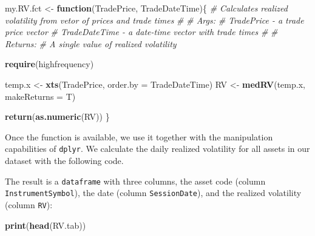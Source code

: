 \documentclass[11pt,]{book}
\newenvironment{Shaded}{\begin{snugshade}}{\end{snugshade}}
\newcommand{\KeywordTok}[1]{\textcolor[rgb]{0.27,0.27,0.27}{\textbf{#1}}}
\newcommand{\DataTypeTok}[1]{\textcolor[rgb]{0.27,0.27,0.27}{#1}}
\newcommand{\StringTok}[1]{\textcolor[rgb]{0.5,0.5,0.5}{#1}}
\newcommand{\CommentTok}[1]{\textcolor[rgb]{0.56,0.35,0.01}{\textit{#1}}}
\newcommand{\ControlFlowTok}[1]{\textcolor[rgb]{0.13,0.29,0.53}{\textbf{#1}}}
\newcommand{\OperatorTok}[1]{\textcolor[rgb]{0.81,0.36,0.00}{\textbf{#1}}}
\newcommand{\NormalTok}[1]{#1}
\begin{document}
\begin{Shaded}
\begin{Highlighting}[]
\NormalTok{my.RV.fct <-}\StringTok{ }\ControlFlowTok{function}\NormalTok{(TradePrice, TradeDateTime)\{}
  \CommentTok{# Calculates realized volatility from vetor of prices and trade times}
  \CommentTok{#}
  \CommentTok{# Args:}
  \CommentTok{#   TradePrice - a trade price vector}
  \CommentTok{#   TradeDateTime - a date-time vector with trade times}
  \CommentTok{#}
  \CommentTok{# Returns:}
  \CommentTok{#   A single value of realized volatility}
  
  \KeywordTok{require}\NormalTok{(highfrequency)}
  
\NormalTok{  temp.x <-}\StringTok{ }\KeywordTok{xts}\NormalTok{(TradePrice, }\DataTypeTok{order.by =}\NormalTok{ TradeDateTime)}
\NormalTok{  RV <-}\StringTok{ }\KeywordTok{medRV}\NormalTok{(temp.x, }\DataTypeTok{makeReturns =}\NormalTok{ T)}
  
  \KeywordTok{return}\NormalTok{(}\KeywordTok{as.numeric}\NormalTok{(RV))}
\NormalTok{\}}
\end{Highlighting}
\end{Shaded}

Once the function is available, we use it together with the manipulation
capabilities of \texttt{dplyr}. We calculate the daily realized
volatility for all assets in our dataset with the following code.

\begin{Shaded}
\end{Shaded}

The result is a \texttt{dataframe} with three columns, the asset code
(column \texttt{InstrumentSymbol}), the date (column
\texttt{SessionDate}), and the realized volatility (column \texttt{RV}):

\begin{Shaded}
\begin{Highlighting}[]
\KeywordTok{print}\NormalTok{(}\KeywordTok{head}\NormalTok{(RV.tab))}
\end{Highlighting}
\end{Shaded}
\end{document}
